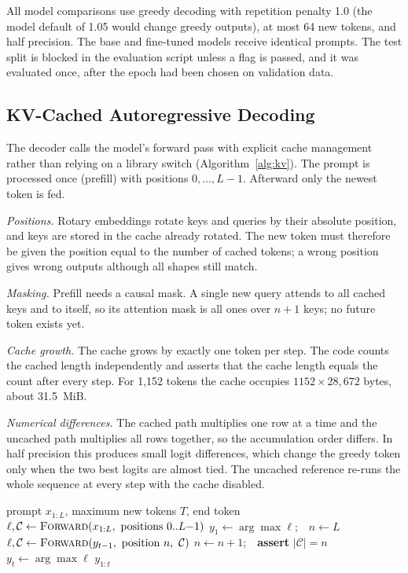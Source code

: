 \documentclass[conference]{IEEEtran}
\begin{document}
All model comparisons use greedy decoding with repetition penalty 1.0 (the model default of 1.05 would change greedy outputs), at most 64 new tokens, and half precision. The base and fine-tuned models receive identical prompts. The test split is blocked in the evaluation script unless a flag is passed, and it was evaluated once, after the epoch had been chosen on validation data.

\subsection{KV-Cached Autoregressive Decoding}
The decoder calls the model's forward pass with explicit cache management rather than relying on a library switch (Algorithm~\ref{alg:kv}). The prompt is processed once (prefill) with positions $0,\dots,L-1$. Afterward only the newest token is fed.

\emph{Positions.} Rotary embeddings \cite{rope} rotate keys and queries by their absolute position, and keys are stored in the cache already rotated. The new token must therefore be given the position equal to the number of cached tokens; a wrong position gives wrong outputs although all shapes still match.

\emph{Masking.} Prefill needs a causal mask. A single new query attends to all cached keys and to itself, so its attention mask is all ones over $n{+}1$ keys; no future token exists yet.

\emph{Cache growth.} The cache grows by exactly one token per step. The code counts the cached length independently and asserts that the cache length equals the count after every step. For 1,152 tokens the cache occupies $1152\times 28{,}672$ bytes, about 31.5~MiB.

\emph{Numerical differences.} The cached path multiplies one row at a time and the uncached path multiplies all rows together, so the accumulation order differs. In half precision this produces small logit differences, which change the greedy token only when the two best logits are almost tied. The uncached reference re-runs the whole sequence at every step with the cache disabled.

\begin{algorithm}[!t]
\caption{Greedy decoding with an explicit KV cache}
\label{alg:kv}
\small
\begin{algorithmic}[1]
\Require prompt $x_{1:L}$, maximum new tokens $T$, end token
\State $\ell,\mathcal{C} \gets \textsc{Forward}(x_{1:L},\ \text{positions } 0..L{-}1)$ 
\State $y_1\gets\arg\max\ell$;\ \ $n\gets L$
  \State $\ell,\mathcal{C}\gets\textsc{Forward}(y_{t-1},\ \text{position } n,\ \mathcal{C})$
  \State $n\gets n+1$;\ \ \textbf{assert} $|\mathcal{C}|=n$
  \State $y_t\gets\arg\max\ell$
\EndFor
\State \Return $y_{1:t}$
\end{algorithmic}
\end{algorithm}
\end{document}
